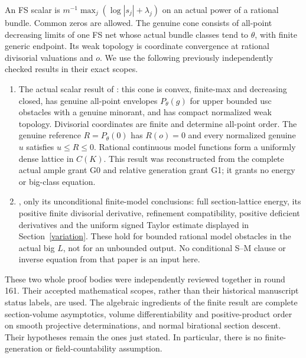 \documentclass[11pt]{article}
\begin{document}
An FS scalar is $m^{-1}\max_j(\log|s_j|+\lambda_j)$ on an
actual power of a rational bundle. Common zeros are allowed.
The genuine cone consists of all-point decreasing limits of one
FS net whose actual bundle classes tend to $\theta$, with finite
generic endpoint. Its weak topology is coordinate convergence at
rational divisorial valuations and $o$. We use the following
previously independently checked results in their exact scopes.
\begin{enumerate}
\item The actual scalar result of \cite[Sections 2--4]{Scalar}:
this cone is convex, finite-max and decreasing closed, has genuine
all-point envelopes $P_\theta(g)$ for upper bounded usc obstacles
with a genuine minorant, and has compact normalized weak topology.
Divisorial coordinates are finite and determine all-point order.
The genuine reference $R=P_\theta(0)$ has $R(o)=0$ and
every normalized genuine $u$ satisfies $u\leq R\leq0$.
Rational continuous model functions form a uniformly dense lattice
in $C(K)$. This result was reconstructed from the complete actual
ample grant G0 and relative generation grant G1; it grants no energy
or big-class equation.
\item \cite[Section 4]{Finite}, only its unconditional finite-model
conclusions: full section-lattice energy, its positive finite
divisorial derivative, refinement compatibility, positive deficient
derivatives and the uniform signed Taylor estimate displayed in
Section~\ref{variation}. These hold for bounded rational model
obstacles in the actual big $L$, not for an unbounded output.
No conditional S--M clause or inverse equation from that paper is
an input here.
\end{enumerate}
These two whole proof bodies were independently reviewed together
in round 161. Their accepted mathematical scopes, rather than their
historical manuscript status labels, are used. The algebraic
ingredients of the finite result are complete section-volume
asymptotics, volume differentiability and positive-product order on
smooth projective determinations, and normal birational section
descent. Their hypotheses remain the ones just stated. In particular,
there is no finite-generation or field-countability assumption.
\end{document}
